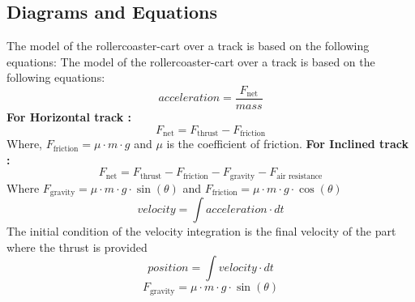 \documentclass{article}
\begin{document}
    \subsection{Diagrams and Equations}
    The model of the rollercoaster-cart over a track is based on the following
    equations: The model of the rollercoaster-cart over a track is based on the following
    equations:
    \begin{equation}
        acceleration = \frac{F_{\text{net}}}{mass}
    \end{equation}
    \textbf{For Horizontal track :}
    \begin{equation}
        F_{\text{net}}= F_{\text{thrust}}- F_{\text{friction}}
    \end{equation}
    Where, $F_{\text{friction}}= \mu \cdot m \cdot g$ and $\mu$ is the
    coefficient of friction.
    \newline
    \newline
    \textbf{For Inclined track :}
    \begin{equation}
        F_{\text{net}}= F_{\text{thrust}}- F_{\text{friction}}- F_{\text{gravity}}
        -F_{\text{air resistance}}
    \end{equation}
    Where $F_{\text{gravity}}= \mu \cdot m \cdot g \cdot \sin(\theta)$ and
    $F_{\text{friction}}= \mu \cdot m \cdot g \cdot \cos(\theta)$
    \newline
    \newline
    \begin{equation}
        velocity = \int acceleration \cdot dt
    \end{equation}
    The initial condition of the velocity integration is the final velocity of
    the part where the thrust is provided
    \begin{equation}
        position = \int velocity \cdot dt
    \end{equation}
    \begin{equation}
        F_{\text{gravity}}=\mu \cdot m \cdot g \cdot \sin(\theta)
    \end{equation}
\end{document}
